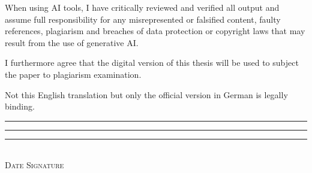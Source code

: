 \noindent
When using AI tools, I have critically reviewed and verified all output and assume full responsibility for any misrepresented or falsified content, faulty references, plagiarism and breaches of data protection or copyright laws that may result from the use of generative AI.

\noindent
I furthermore agree that the digital version of this thesis will be used to subject the paper to plagiarism examination.

\noindent
Not this English translation but only the official version in German is legally binding.


\makeatletter
\vspace{2cm}
\rule{3cm}{0.1pt} \hfill \rule{6cm}{0.1pt} \hfill \rule{3cm}{0.1pt}\\
\hspace*{1cm} \textsc{Date} \hspace*{2.7cm} \textsc{\@author} \hspace*{2.2cm} \textsc{Signature}
\makeatother

\cleardoublepage

\pagestyle{scrheadings} %

\tableofcontents

\cleardoublepage
